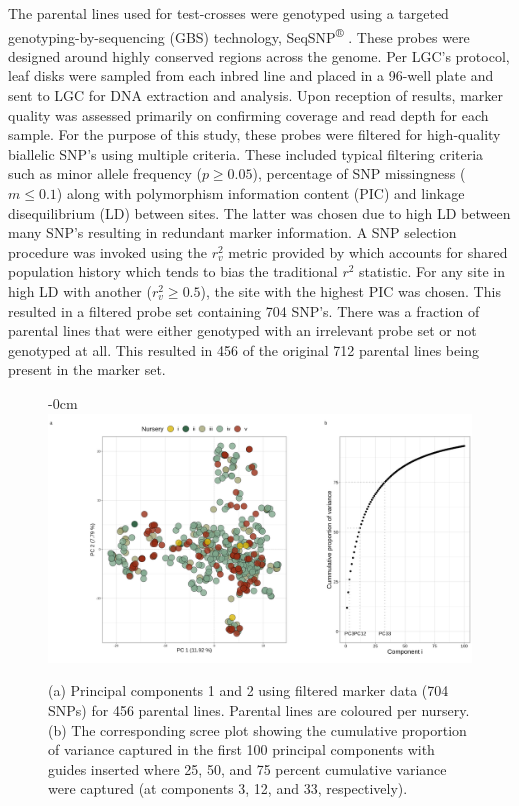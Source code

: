 The parental lines used for test-crosses were genotyped using a targeted genotyping-by-sequencing (GBS) technology, SeqSNP\textsuperscript{®} \parencite{LGC2019}. These probes were designed around highly conserved regions across the genome. Per LGC's protocol, leaf disks were sampled from each inbred line and placed in a 96-well plate and sent to LGC for DNA extraction and analysis. Upon reception of results, marker quality was assessed primarily on confirming coverage and read depth for each sample. For the purpose of this study, these probes were filtered for high-quality biallelic SNP's using multiple criteria. These included typical filtering criteria such as minor allele frequency (\(p \ge 0.05\)), percentage of SNP missingness (\(m \le 0.1\)) along with polymorphism information content (PIC) and linkage disequilibrium (LD) between sites. The latter was chosen due to high LD between many SNP's resulting in redundant marker information. A SNP selection procedure was invoked using the \(r^2_v\) metric provided by \parencite{Mangin2012} which accounts for shared population history which tends to bias the traditional \(r^2\) statistic.  For any site in high LD with another (\(r^2_v \ge 0.5\)), the site with the highest PIC was chosen. This resulted in a filtered probe set containing 704 SNP's. There was a fraction of parental lines that were either genotyped with an irrelevant probe set or not genotyped at all. This resulted in 456 of the original 712 parental lines being present in the marker set.

\begin{figure}[H]
\begin{adjustwidth}{-\extralength}{0cm}
\centering
\includegraphics[width=15.5cm]{figs_03/1664970293popPca.png}
\end{adjustwidth}
\caption{(a) Principal components 1 and 2 using filtered marker data (704 SNPs) for 456 parental lines. Parental lines are coloured per nursery. (b) The corresponding scree plot showing the cumulative proportion of variance captured in the first 100 principal components with guides inserted where 25, 50, and 75 percent cumulative variance were captured (at components 3, 12, and 33, respectively).}\label{fig:pca}
\end{figure}

